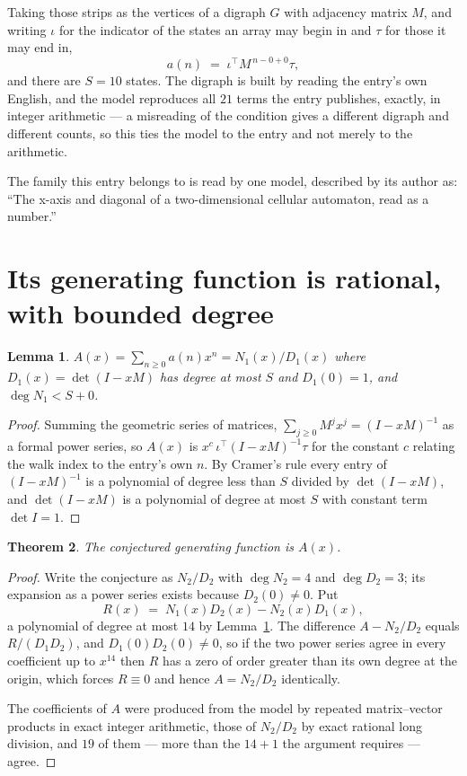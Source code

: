 \documentclass[11pt,a4paper]{article}
\theoremstyle{plain}
\newtheorem{theorem}{Theorem}
\newtheorem{lemma}[theorem]{Lemma}
\theoremstyle{definition}
\begin{document}
Taking those strips as the vertices of a digraph $G$ with adjacency matrix $M$, and writing
$\iota$ for the indicator of the states an array may begin in and $\tau$ for those it may end
in,
\[
a(n)\;=\;\iota^{\!\top}M^{\,n-0+0}\tau ,
\]
and there are $S=10$ states. The digraph is built by reading the entry's own English, and the
model reproduces all $21$ terms the entry publishes, exactly, in integer arithmetic --- a
misreading of the condition gives a different digraph and different counts, so this ties the
model to the entry and not merely to the arithmetic.

The family this entry belongs to is read by one model, described by its author as: ``The x-axis and diagonal of a two-dimensional cellular automaton, read as a number.''


\section{Its generating function is rational, with bounded degree}

\begin{lemma}\label{lem:rat}
$A(x)=\sum_{n\ge0}a(n)x^n=N_1(x)/D_1(x)$ where $D_1(x)=\det(I-xM)$ has degree at most
$S$ and $D_1(0)=1$, and $\deg N_1<S+0$.
\end{lemma}

\begin{proof}
Summing the geometric series of matrices, $\sum_{j\ge0}M^jx^j=(I-xM)^{-1}$ as a formal
power series, so $A(x)$ is $x^{c}\,\iota^{\!\top}(I-xM)^{-1}\tau$ for the constant $c$
relating the walk index to the entry's own $n$. By Cramer's rule every entry of
$(I-xM)^{-1}$ is a polynomial of degree less than $S$ divided by $\det(I-xM)$, and
$\det(I-xM)$ is a polynomial of degree at most $S$ with constant term $\det I=1$.
\end{proof}

\begin{theorem}
The conjectured generating function is $A(x)$.
\end{theorem}

\begin{proof}
Write the conjecture as $N_2/D_2$ with $\deg N_2=4$ and $\deg D_2=3$; its expansion as a
power series exists because $D_2(0)\neq0$. Put
\[
R(x)\;=\;N_1(x)D_2(x)-N_2(x)D_1(x),
\]
a polynomial of degree at most $14$ by Lemma~\ref{lem:rat}. The difference
$A-N_2/D_2$ equals $R/(D_1D_2)$, and $D_1(0)D_2(0)\neq0$, so if the two power series agree in
every coefficient up to $x^{14}$ then $R$ has a zero of order greater than its own
degree at the origin, which forces $R\equiv0$ and hence $A=N_2/D_2$ identically.

The coefficients of $A$ were produced from the model by repeated matrix--vector products in
exact integer arithmetic, those of $N_2/D_2$ by exact rational long division, and $19$
of them --- more than the $14+1$ the argument requires --- agree.
\end{proof}
\end{document}
